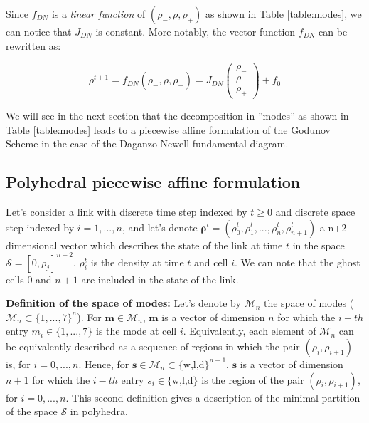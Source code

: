 \documentclass[11pt]{article}
\numberwithin{equation}{section}
\numberwithin{figure}{section}
\numberwithin{table}{section}
\begin{document}
Since $f_{DN}$ is a \textit{linear function} of $(\rho_{-},\rho,\rho_{+})$ as shown in Table \ref{table:modes}, we can notice that $J_{DN}$ is constant. More notably, the vector function $f_{DN}$ can be rewritten as:

\begin{equation}
\rho^{t+1} = f_{DN}(\rho_{-},\rho,\rho_{+}) = J_{DN}\left( \begin{array}{c}
\rho_{-}\\
\rho\\
\rho_{+}
\end{array} \right)
+ f_{0}
\label{eq:fDN}
\end{equation}

We will see in the next section that the decomposition in ''modes'' as shown in Table \ref{table:modes} leads to a piecewise affine formulation of the Godunov Scheme in the case of the Daganzo-Newell fundamental diagram. 


\subsection{Polyhedral piecewise affine formulation}\label{sec:formulation}

Let's consider a link with discrete time step indexed by $t\geq 0$ and discrete space step indexed by $i = 1,...,n$, and let's denote $\boldsymbol\rho^{t} = (\rho^{t}_{0},\rho^{t}_{1},...,\rho^{t}_{n},\rho^{t}_{n+1})$ a n+2 dimensional vector which describes the state of the link at time $t$ in the space $\mathcal{S} = [0,\rho_{j}]^{n+2}$. $\rho^{t}_{i}$ is the density at time $t$ and cell $i$. We can note that the ghost cells $0$ and $n+1$ are included in the state of the link.

\hspace{10mm}

\noindent\textbf{Definition of the space of modes:} Let's denote by $\mathcal{M}_{n}$ the space of modes ($\mathcal{M}_{n}\subset\{1,...,7\}^{n}$). For $\boldsymbol m \in \mathcal{M}_{n}$, $\boldsymbol m$ is a vector of dimension $n$ for which the $i-th$ entry $m_{i}\in\{1,...,7\}$ is the mode at cell $i$. Equivalently, each element of $\mathcal{M}_{n}$ can be equivalently described as a sequence of regions in which the pair $(\rho_{i},\rho_{i+1})$ is, for $i=0,...,n$. Hence, for $\boldsymbol s \in \mathcal{M}_{n}\subset\{\text{w,l,d}\}^{n+1}$, $\boldsymbol s$ is a vector of dimension $n+1$ for which the $i-th$ entry $s_{i}\in\{\text{w,l,d}\}$ is the region of the pair $(\rho_{i},\rho_{i+1})$, for $i=0,...,n$. This second definition gives a description of the minimal partition of the space $\mathcal{S}$ in polyhedra.
\end{document}
